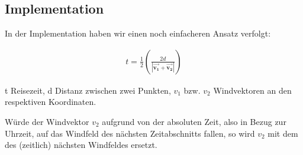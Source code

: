 \subsection{Implementation}
In der Implementation haben wir einen noch einfacheren Ansatz verfolgt:

\begin{align}
t = \frac{1}{2} (\frac{2d}{|\mathbf{\overrightarrow{v_{1}}} + \mathbf{\overrightarrow{v_{2}}}|})
\end{align}

t Reisezeit, d Distanz zwischen zwei Punkten, $v_{1}$ bzw. $v_{2}$
Windvektoren an den respektiven Koordinaten.

\vspace{0.5cm}

Würde der Windvektor $v_{2}$ aufgrund von der absoluten Zeit, also in
Bezug zur Uhrzeit, auf das Windfeld des nächsten Zeitabschnitts fallen,
so wird $v_{2}$ mit dem des (zeitlich) nächsten Windfeldes ersetzt.

